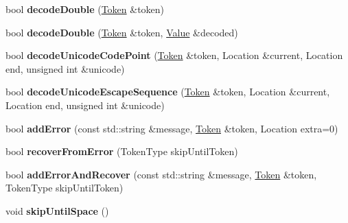 \begin{DoxyCompactItemize}
\item 
\hypertarget{class_json_1_1_our_reader_a1d1c3b44f6720a0e7c39b5ae8de3981c}{}bool {\bfseries decode\+Double} (\hyperlink{class_json_1_1_our_reader_1_1_token}{Token} \&token)\label{class_json_1_1_our_reader_a1d1c3b44f6720a0e7c39b5ae8de3981c}

\item 
\hypertarget{class_json_1_1_our_reader_aa5c15a8cd32754f07430dedba3d1308e}{}bool {\bfseries decode\+Double} (\hyperlink{class_json_1_1_our_reader_1_1_token}{Token} \&token, \hyperlink{class_json_1_1_value}{Value} \&decoded)\label{class_json_1_1_our_reader_aa5c15a8cd32754f07430dedba3d1308e}

\item 
\hypertarget{class_json_1_1_our_reader_ac1bf03c161ece082e48da450c50f528d}{}bool {\bfseries decode\+Unicode\+Code\+Point} (\hyperlink{class_json_1_1_our_reader_1_1_token}{Token} \&token, Location \&current, Location end, unsigned int \&unicode)\label{class_json_1_1_our_reader_ac1bf03c161ece082e48da450c50f528d}

\item 
\hypertarget{class_json_1_1_our_reader_adb39be814cc6076b91a0919bdd5b24b0}{}bool {\bfseries decode\+Unicode\+Escape\+Sequence} (\hyperlink{class_json_1_1_our_reader_1_1_token}{Token} \&token, Location \&current, Location end, unsigned int \&unicode)\label{class_json_1_1_our_reader_adb39be814cc6076b91a0919bdd5b24b0}

\item 
\hypertarget{class_json_1_1_our_reader_a5a48b71c1c16fa671814c8338e452bc0}{}bool {\bfseries add\+Error} (const std\+::string \&message, \hyperlink{class_json_1_1_our_reader_1_1_token}{Token} \&token, Location extra=0)\label{class_json_1_1_our_reader_a5a48b71c1c16fa671814c8338e452bc0}

\item 
\hypertarget{class_json_1_1_our_reader_a035651f0700a76a815e5f904c63ebb1c}{}bool {\bfseries recover\+From\+Error} (Token\+Type skip\+Until\+Token)\label{class_json_1_1_our_reader_a035651f0700a76a815e5f904c63ebb1c}

\item 
\hypertarget{class_json_1_1_our_reader_ae68a7047acd692be8077e259d524c6d9}{}bool {\bfseries add\+Error\+And\+Recover} (const std\+::string \&message, \hyperlink{class_json_1_1_our_reader_1_1_token}{Token} \&token, Token\+Type skip\+Until\+Token)\label{class_json_1_1_our_reader_ae68a7047acd692be8077e259d524c6d9}

\item 
\hypertarget{class_json_1_1_our_reader_ad48bdaf5b686706f003e792fdbcbf102}{}void {\bfseries skip\+Until\+Space} ()\label{class_json_1_1_our_reader_ad48bdaf5b686706f003e792fdbcbf102}


\end{DoxyCompactItemize}
